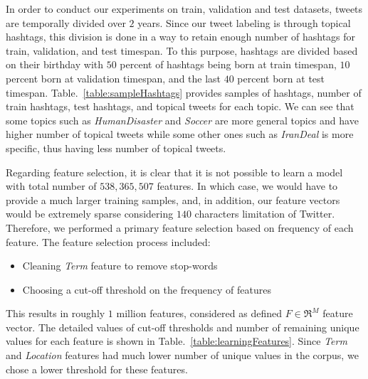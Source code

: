 \label{label:split}
In order to conduct our experiments on train, validation and test datasets, tweets are temporally divided over $2$ years. Since our tweet labeling is through topical hashtags, this division is done in a way to retain enough number of hashtags for train, validation, and test timespan. To this purpose, hashtags are divided based on their birthday with $50$ percent of hashtags being born at train timespan, $10$ percent born at validation timespan, and the last $40$ percent born at test timespan.
Table.~\ref{table:sampleHashtags} provides samples of hashtags, number of train hashtags, test hashtags, and topical tweets for each topic. We can see that some topics such as \textit{HumanDisaster} and \textit{Soccer} are more general topics and have higher number of topical tweets while some other ones such as \textit{IranDeal} is more specific, thus having less number of topical tweets.

Regarding feature selection, it is clear that it is not possible to learn a model with total number of $538,365,507$ features. In which case, we would have to provide a much larger training samples, and, in addition, our feature vectors would be extremely sparse considering $140$ characters limitation of Twitter. Therefore, we performed a primary feature selection based on frequency of each feature. The feature selection process included:
\begin{itemize}
\item Cleaning \textit{Term} feature to remove stop-words
\item Choosing a cut-off threshold on the frequency of features
\end{itemize} 
This results in roughly $1$ million features, considered as defined $F \in \Re^{M}$ feature vector. The detailed values of cut-off thresholds and number of remaining unique values for each feature is shown in Table.~\ref{table:learningFeatures}. Since \textit{Term} and \textit{Location} features had much lower number of unique values in the corpus, we chose a lower threshold for these features.

